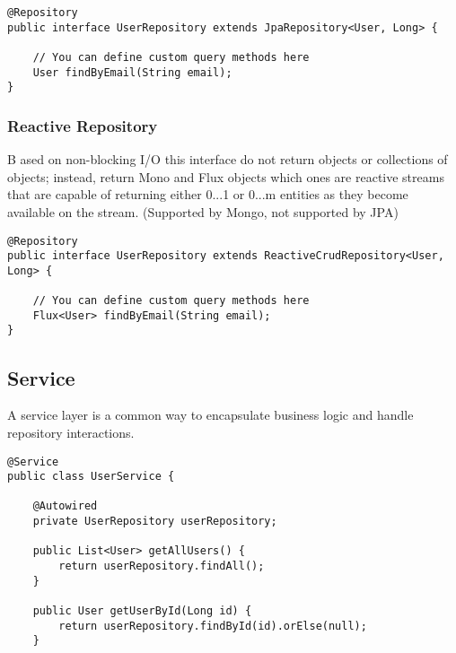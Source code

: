 \documentclass[a4paper, 12pt]{article}
\begin{document}
    \begin{lstlisting}
@Repository
public interface UserRepository extends JpaRepository<User, Long> {

    // You can define custom query methods here
    User findByEmail(String email);
}
    \end{lstlisting}

    \subsubsection{Reactive Repository}
    B ased on non-blocking I/O this interface do not
    return objects or collections of objects; instead, return Mono and Flux objects which ones are reactive streams that are
    capable of returning either 0...1 or 0...m entities as they become available on the stream. (Supported by Mongo, not supported by JPA)
    \begin{lstlisting}
@Repository
public interface UserRepository extends ReactiveCrudRepository<User, Long> {

    // You can define custom query methods here
    Flux<User> findByEmail(String email);
}
    \end{lstlisting}

    \subsection{Service}
    A service layer is a common way to encapsulate business logic and handle repository interactions.
    \begin{lstlisting}
@Service
public class UserService {

    @Autowired
    private UserRepository userRepository;

    public List<User> getAllUsers() {
        return userRepository.findAll();
    }

    public User getUserById(Long id) {
        return userRepository.findById(id).orElse(null);
    }
    \end{lstlisting}
\end{document}
